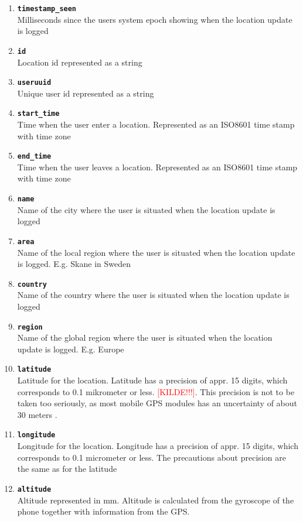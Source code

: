 \begin{enumerate}
\item \texttt{\textbf{timestamp\_seen}}\\Milliseconds since the users system epoch showing when the location update is logged  
\item \texttt{\textbf{id}}\\Location id represented as a string  
\item \texttt{\textbf{useruuid}}\\Unique user id represented as a string 
\item \texttt{\textbf{start\_time}}\\Time when the user enter a location. Represented as an ISO8601 time stamp with time zone 
\item \texttt{\textbf{end\_time}}\\Time when the user leaves a location. Represented as an ISO8601 time stamp with time zone
\item \texttt{\textbf{name}}\\Name of the city where the user is situated when the location update is logged 
\item \texttt{\textbf{area}}\\Name of the local region where the user is situated when the location update is logged. E.g. Skane in Sweden 
\item \texttt{\textbf{country}}\\Name of the country where the user is situated when the location update is logged 
\item \texttt{\textbf{region}}\\Name of the global region where the user is situated when the location update is logged. E.g. Europe
\item \texttt{\textbf{latitude}}\\Latitude for the location. Latitude has a precision of appr. 15 digits, which corresponds to 0.1 mikrometer or less.  \textcolor{red}{[KILDE!!!]}. This precision is not to be taken too seriously, as most mobile GPS modules has an uncertainty of about 30 meters   \cite{NAV:8292634}.  
\item \texttt{\textbf{longitude}}\\Longitude for the location. Longitude has a precision of appr. 15 digits, which corresponds to 0.1 micrometer or less. The precautions about precision are the same as for the latitude 
\item \texttt{\textbf{altitude}}\\Altitude represented in mm. Altitude is calculated from the gyroscope of the phone together with information from the GPS.  

\end{enumerate}
